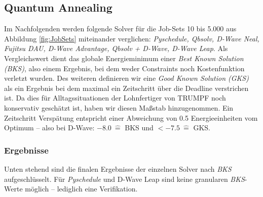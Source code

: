 \subsection{Quantum Annealing}
\label{subsec:annealing}
Im Nachfolgenden werden folgende Solver für die Job-Sets 10 bis 5.000 aus Abbildung \ref{fig:JobSets} miteinander verglichen: \textit{Pyschedule, Qbsolv, D-Wave Neal, Fujitsu DAU, D-Wave Advantage, Qbsolv + D-Wave, D-Wave Leap}.
Als Vergleichswert dient das globale Energieminimum einer \textit{Best Known Solution (BKS)}, also einem Ergebnis, bei dem weder Constraints noch Kostenfunktion verletzt wurden. Des weiteren definieren wir eine  \textit{Good Known Solution (GKS)} als ein Ergebnis bei dem maximal ein Zeitschritt über die Deadline verstrichen ist. Da dies für Alltagssituationen der Lohnfertiger von TRUMPF noch konservativ geschätzt ist, haben wir diesen Maßstab hinzugenommen. Ein Zeitschritt Verspätung entspricht einer Abweichung von 0.5 Energieeinheiten vom Optimum --  also bei D-Wave: $-8.0~\widehat{=}$  BKS und $<-7.5~\widehat{=}$ GKS.

\subsubsection{Ergebnisse}
Unten stehend sind die finalen Ergebnisse der einzelnen Solver nach \textit{BKS} aufgeschlüsselt. Für \textit{Pyschedule} und D-Wave Leap sind keine granularen \textit{BKS}-Werte möglich -- lediglich eine Verifikation.

